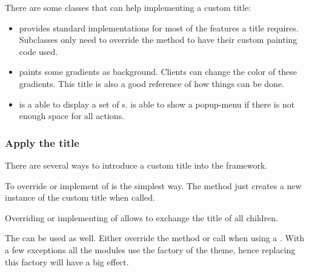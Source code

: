 There are some classes that can help implementing a custom title:
\begin{itemize}
	\item {} provides standard implementations for most of the features a title requires. Subclasses only need to override the method \linebreak {} to have their custom painting code used.
	\item {} paints some gradients as background. Clients can change the color of these gradients. This title is also a good reference of how things can be done.
	\item {} is a  able to display a set of s. \linebreak {} is able to show a popup-menu if there is not enough space for all actions.
\end{itemize}


\subsubsection{Apply the title}
There are several ways to introduce a custom title into the framework.

To override or implement  of  is the simplest way. The method just creates a new instance of the custom title when called.

Overriding or implementing  of  allows to exchange the title of all children.

The  can be used as well. Either override the method \linebreak {} or call  when using a . With a few exceptions all the modules use the factory of the theme, hence replacing this factory will have a big effect.

